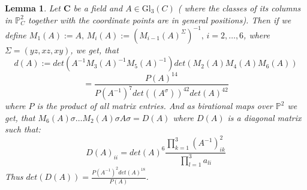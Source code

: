 \documentclass[12pt, oneside, reqno]{amsart}
\newtheorem{lemma}[theorem]{Lemma}
\begin{document}
\begin{lemma} \label{LargeCalc}
    Let $\textbf{C}$ be a field and $A \in \mathrm{Gl}_3(C)$ ( where the classes of its columns in $\mathbb{P}^2_C$ together with the coordinate points are in general positions). Then if we define $M_1(A):= A, \, M_i(A) := (M_{i-1}(A)^{\Sigma})^{-1}, \, i=2, \dots , 6$, where $\Sigma = (yz,xz,xy)$, we get, that \[d(A):= det(A^{-1}M_3(A)^{-1}M_5(A)^{-1})det(M_2(A)M_4(A)M_6(A))\] \[= \frac{P(A)^{14}}{P(A^{-1})^7 det((A^{\sigma}))^{42}det(A)^{42}}\] where $P$ is the product of all matrix entries. And as birational maps over $\mathbb{P}^2$ we get, that $M_6(A) \sigma \dots M_2(A) \sigma A \sigma = D(A)$ where $D(A)$ is a diagonal matrix such that:
    \newline
    \[D(A)_{ii} = det(A)^6\frac{\prod_{k=1}^3(A^{-1})_{ik}^2}{\prod_{l=1}^3a_{li}}\]
    Thus $det(D(A)) =\frac{P(A^{-1})^2det(A)^{18}}{P(A)}$.
\end{lemma}
\end{document}
